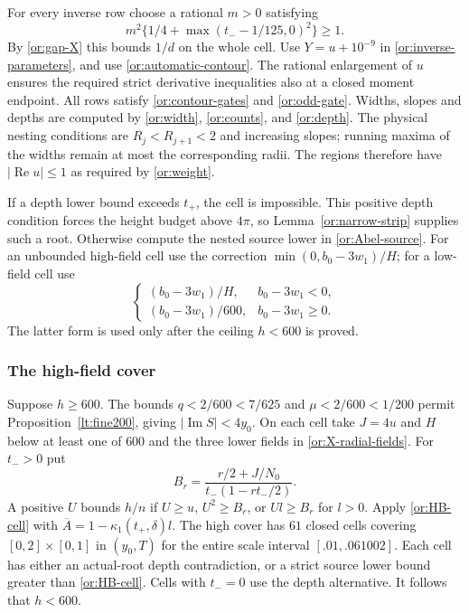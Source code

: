 \documentclass[11pt,reqno]{amsart}
\numberwithin{equation}{section}
\theoremstyle{definition}
\theoremstyle{remark}
\renewcommand{\Re}{\operatorname{Re}}
\renewcommand{\Im}{\operatorname{Im}}
\begin{document}
For every inverse row choose a rational $m>0$ satisfying
\begin{equation}\label{or:X-m-cell}
              m^2\{1/4+\max(t_--1/125,0)^2\}\ge1.
\end{equation}
By \eqref{or:gap-X} this bounds $1/d$ on the whole cell.  Use
$Y=u+10^{-9}$ in \eqref{or:inverse-parameters}, and use
\eqref{or:automatic-contour}.  The rational enlargement of $u$
ensures the required strict derivative inequalities also at a closed
moment endpoint.  All rows satisfy \eqref{or:contour-gates} and
\eqref{or:odd-gate}.  Widths, slopes and depths are computed by
\eqref{or:width}, \eqref{or:counts}, and \eqref{or:depth}.
The physical nesting conditions are $R_j<R_{j+1}<2$ and increasing
slopes; running maxima of the widths remain at most the corresponding
radii.  The regions therefore have $|\Re u|\le1$ as required by
\eqref{or:weight}.

If a depth lower bound exceeds $t_+$, the cell is impossible.  This
positive depth condition forces the height budget above $4\pi$,
so Lemma~\ref{or:narrow-strip} supplies such a root.
Otherwise compute the nested source lower in \eqref{or:Abel-source}.
For an unbounded high-field cell use the correction
$\min(0,b_0-3w_1)/H$; for a low-field cell use
\begin{equation}\label{or:X-signed-correction}
 \begin{cases}
  (b_0-3w_1)/H,&b_0-3w_1<0,\\
  (b_0-3w_1)/600,&b_0-3w_1\ge0.
 \end{cases}
\end{equation}
The latter form is used only after the ceiling $h<600$ is proved.

\subsubsection{The high-field cover}

Suppose $h\ge600$.  The bounds $q<2/600<7/625$ and
$\mu<2/600<1/200$ permit
Proposition~\ref{lt:fine200}, giving $|\Im S|<4y_0$.
On each cell take $J=4u$ and $H$ below at least one of $600$ and
the three lower fields in \eqref{or:X-radial-fields}.
For $t_->0$ put
\begin{equation}\label{or:X-high-radial}
       B_r=\frac{r/2+J/N_0}{t_-(1-rt_-/2)}.
\end{equation}
A positive $U$ bounds $h/n$ if $U\ge u$, $U^2\ge B_r$, or
$Ul\ge B_r$ for $l>0$.  Apply \eqref{or:HB-cell} with
$\overline A=1-\kappa_1(t_+,\delta)l$.  The high cover has
$61$ closed cells covering $[0,2]\times[0,1]$ in $(y_0,T)$ for
the entire scale interval $[.01,.061002]$.  Each cell has either
an actual-root depth contradiction, or a strict source lower bound
greater than \eqref{or:HB-cell}.  Cells with $t_-=0$ use the
depth alternative.  It follows that $h<600$.
\end{document}

